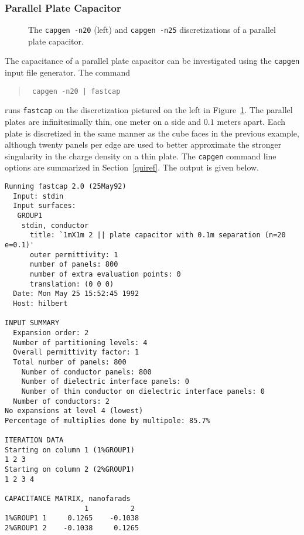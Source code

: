 \subsubsection{Parallel Plate Capacitor}
\label{parpla}

%
%
\begin{figure}
\centerline{
}
\caption{The {\tt capgen -n20} (left) and {\tt capgen -n25} discretizations of a parallel plate capacitor.}
\label{pltcap}
\end{figure}

The capacitance of a parallel plate capacitor 
can be investigated using the {\tt capgen} input file generator.
The command
\begin{quote}\tt
capgen -n20 | fastcap
\end{quote}
runs {\tt fastcap} on the discretization pictured on the left
in Figure~\ref{pltcap}.
The parallel plates are infinitesimally thin, one meter on a side and
$0.1$ meters apart. Each plate is discretized in the same manner as
the cube faces in the previous example, although twenty
panels per edge are used to better approximate the stronger
singularity in the charge density on a thin plate. The {\tt capgen}
command line options are summarized in Section~\ref{quiref}. The output
is given below.
\begin{verbatim}
Running fastcap 2.0 (25May92)
  Input: stdin
  Input surfaces:
   GROUP1
    stdin, conductor
      title: `1mX1m 2 || plate capacitor with 0.1m separation (n=20 e=0.1)'
      outer permittivity: 1
      number of panels: 800
      number of extra evaluation points: 0
      translation: (0 0 0)
  Date: Mon May 25 15:52:45 1992
  Host: hilbert

INPUT SUMMARY
  Expansion order: 2
  Number of partitioning levels: 4
  Overall permittivity factor: 1
  Total number of panels: 800
    Number of conductor panels: 800
    Number of dielectric interface panels: 0
    Number of thin conductor on dielectric interface panels: 0
  Number of conductors: 2
No expansions at level 4 (lowest)
Percentage of multiplies done by multipole: 85.7%

ITERATION DATA
Starting on column 1 (1%GROUP1)
1 2 3
Starting on column 2 (2%GROUP1)
1 2 3 4

CAPACITANCE MATRIX, nanofarads
                   1          2
1%GROUP1 1     0.1265    -0.1038
2%GROUP1 2    -0.1038     0.1265
\end{verbatim}

